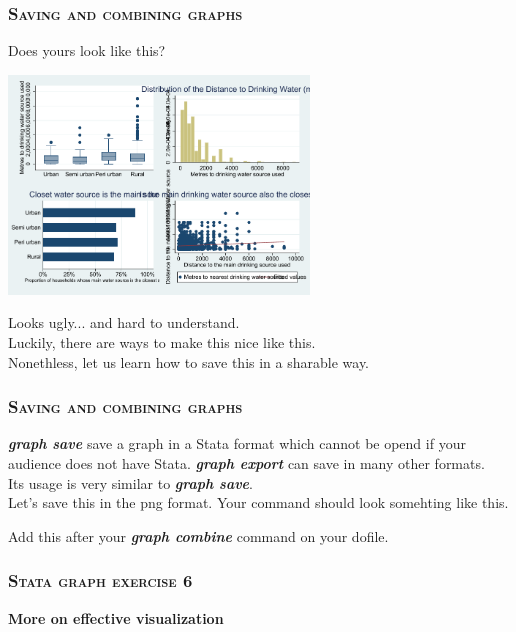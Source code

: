 \documentclass[10pt]{beamer}
\begin{document}
	\begin{frame}
	\frametitle{\textsc{Saving and combining graphs}}
		 Does yours look like this?
	
\begin{center}
    \includegraphics[width=0.6\textwidth]{combined.pdf}
\end{center}
		 Looks ugly... and hard to understand. \\ \vspace{1mm}
					 Luckily, there are ways to make this nice like this. \\
		\onslide<3-> Nonethless, let us learn how to save this in a sharable way.
	\end{frame}
	
	\begin{frame}
	\frametitle{\textsc{Saving and combining graphs}}
		 \textbf{\textit{graph save}} save a graph in a Stata format
					 which cannot be opend if your audience does not have Stata.
		\vspace{2mm}
		\onslide<2-> \textbf{\textit{graph export}} can save in many other formats. \\
		\vspace{2mm}
					 Its usage is very similar to \textbf{\textit{graph save}}. \\
		\vspace{2mm}
					 Let's save this in the png format.
		\onslide<3-> Your command should look somehting like this. 
					 
	
\begin{stlog}\end{stlog}
		Add this after your \textbf{\textit{graph combine}} command on your dofile.
	\end{frame}

	\begin{frame}
	\frametitle{\textsc{Stata graph exercise 6}}
		\begin{center}
		\Large \textbf{More on effective visualization}
		\end{center}
	\end{frame}	
	
\end{document}
